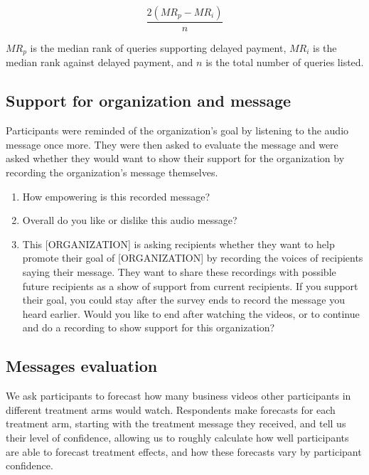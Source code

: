 \documentclass[11pt, a4paper]{article}\usepackage[]{graphicx}\usepackage[]{color}
\begin{document}
        \begin{equation}
            \frac{2 (MR_p - MR_i)}{n}
        \end{equation}

        $MR_p$ is the median rank of queries supporting delayed payment, $MR_i$ is the median rank against delayed payment, and $n$ is the total number of queries listed.

    \subsection{Support for organization and message}
    
    Participants were reminded of the organization's goal by listening to the audio message once more. They were then asked to evaluate the message and were asked whether they would want to show their support for the organization by recording the organization's message themselves. 
        \begin{enumerate}
        \itemsep0em 
       \item  How empowering is this recorded message? 
       \item  Overall do you like or dislike this audio message?
       \item  This [ORGANIZATION] is asking recipients whether they want to help promote their goal of [ORGANIZATION] by recording the voices of recipients saying their message. They want to share these recordings with possible future recipients as a show of support from current recipients. If you support their goal, you could stay after the survey ends to record the message you heard earlier. Would you like to end after watching the videos, or to continue and do a recording to show support for this organization?
          \end{enumerate}

    \subsection{Messages evaluation}
    
    We ask participants to forecast how many business videos other participants in different treatment arms would watch. Respondents make forecasts for each treatment arm, starting with the treatment message they received, and tell us their level of confidence, allowing us to roughly calculate how well participants are able to forecast treatment effects, and how these forecasts vary by participant confidence. 
    
\end{document}
